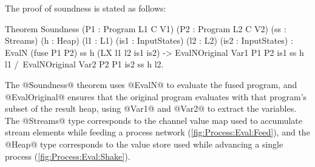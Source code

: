The proof of soundness is stated as follows:


\begin{coq}
Theorem Soundness (P1 : Program L1 C V1) (P2  : Program L2 C V2)
                  (ss : Streams)         (h   : Heap)
                  (l1 : L1)              (is1 : InputStates)
                  (l2 : L2)              (is2 : InputStates)
  :  EvalN (fuse P1 P2) ss h (LX l1 l2 is1 is2)
  -> EvalNOriginal Var1 P1 P2 is1 ss h l1
  /\ EvalNOriginal Var2 P2 P1 is2 ss h l2.
\end{coq}

The @Soundness@ theorem uses @EvalN@ to evaluate the fused program, and @EvalOriginal@ ensures that the original program evaluates with that program's subset of the result heap, using @Var1@ and @Var2@ to extract the variables.
The @Streams@ type corresponds to the channel value map used to accumulate stream elements while feeding a process network (\cref{fig:Process:Eval:Feed}), and the @Heap@ type corresponds to the value store used while advancing a single process (\cref{fig:Process:Eval:Shake}).


